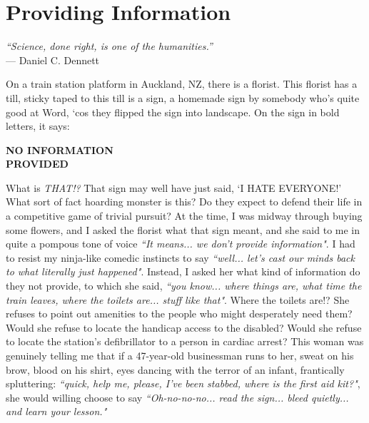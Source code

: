 \chapter{Providing Information}
\begin{flushright}
    \textit{``Science, done right, is one of the humanities.''}
    \\ --- Daniel C. Dennett
\end{flushright}

On a train station platform in Auckland, NZ, there is a florist. This florist has a till, sticky taped to this till is a sign, a homemade sign by somebody who's quite good at Word, `cos they flipped the sign into landscape. On the sign in bold letters, it says:

\begin{center}
\textbf{NO INFORMATION \\ PROVIDED}
\end{center}

What is \textit{THAT!?} That sign may well have just said, `I HATE EVERYONE!' What sort of fact hoarding monster is this? Do they expect to defend their life in a competitive game of trivial pursuit? At the time, I was midway through buying some flowers, and I asked the florist what that sign meant, and she said to me in quite a pompous tone of voice \textit{``It means... we don't provide information"}. I had to resist my ninja-like comedic instincts to say \textit{``well... let's cast our minds back to what literally just happened"}. Instead, I asked her what kind of information do they not provide, to which she said, \textit{``you know... where things are, what time the train leaves, where the toilets are... stuff like that"}. Where the toilets are!? She refuses to point out amenities to the people who might desperately need them? Would she refuse to locate the handicap access to the disabled? Would she refuse to locate the station's defibrillator to a person in cardiac arrest? This woman was genuinely telling me that if a 47-year-old businessman runs to her, sweat on his brow, blood on his shirt, eyes dancing with the terror of an infant, frantically spluttering: \textit{``quick, help me, please, I've been stabbed, where is the first aid kit?"}, she would willing choose to say \textit{``Oh-no-no-no... read the sign... bleed quietly... and learn your lesson."}




